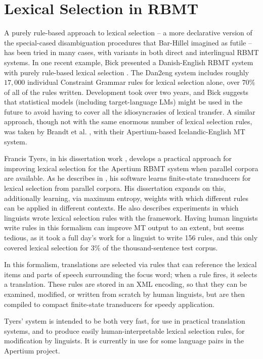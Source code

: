 \section{Lexical Selection in RBMT}
A purely rule-based approach to lexical selection -- a more declarative version
of the special-cased disambiguation procedures that Bar-Hillel imagined as
futile -- has been tried in many cases, with variants in both direct and
interlingual RBMT systems.
In one recent example, Bick presented a Danish-English RBMT system with purely
rule-based lexical selection \cite{bickdan2eng}. The Dan2eng system includes
roughly $17,000$ individual Constraint Grammar rules for lexical selection
alone, over $70\%$ of all of the rules written. Development took over two
years, and Bick suggests that statistical models (including target-language
LMs) might be used in the future to avoid having to cover all the
idiosyncrasies of lexical transfer.
A similar approach, though not with the same enormous number of lexical
selection rules, was taken by Brandt et al. \cite{brandt2011apertium}, with
their Apertium-based Icelandic-English MT system.

Francis Tyers, in his dissertation work \cite{tyers-dissertation}, develops a
practical approach for improving lexical selection for the Apertium RBMT
system when parallel corpora are available.
As he describes in \cite{tyers-fst}, his software learns finite-state
transducers for lexical selection from parallel corpora.
His dissertation expands on this, additionally learning, via maximum entropy,
weights with which different rules can be applied in different contexts.
He also describes experiments in which linguists wrote lexical selection rules
with the framework. Having human linguists write rules in this formalism can
improve MT output to an extent, but seems tedious, as it took a full day's work
for a linguist to write 156 rules, and this only covered lexical selection for
3\% of the thousand-sentence test corpus.

In this formalism, translations are selected via rules that can reference the
lexical items and parts of speech surrounding the focus word; when a rule
fires, it selects a translation. These rules are stored in an XML encoding, so
that they can be examined, modified, or written from scratch by human
linguists, but are then compiled to compact finite-state transducers for speedy
application.

Tyers' system is intended to be both very fast, for use in practical
translation systems, and to produce easily human-interpretable lexical
selection rules, for modification by linguists. It is currently in use for
some language pairs in the Apertium project.

